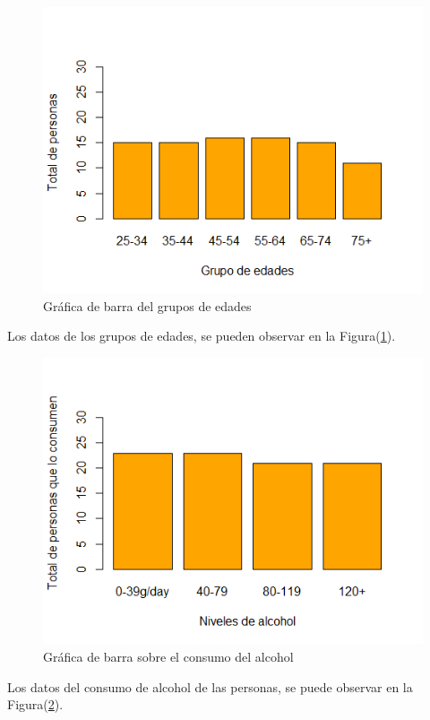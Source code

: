 \documentclass[12pt,a4paper]{article}
\begin{document}
\begin{figure}
	\centering
	\includegraphics[scale = 0.7]{agegp.png}
	\caption{Gráfica de barra del grupos de edades} \label{fig:agegp}
\end{figure}
Los datos de los grupos de edades, se pueden observar en la Figura(\ref{fig:agegp}).

\begin{figure}
	\centering
	\includegraphics[scale = 0.7]{alcgp.png}
	\caption{Gráfica de barra sobre el consumo del alcohol} \label{fig:alcgp}
\end{figure}
Los datos del consumo de alcohol de las personas, se puede observar en la Figura(\ref{fig:alcgp}).
\end{document}
